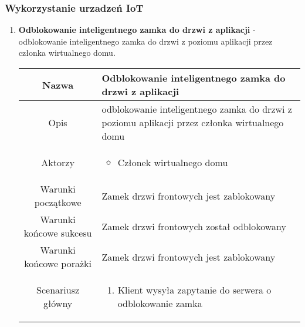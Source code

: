 \documentclass{article}
\begin{document}
\begin{enumerate}
		\subsubsection{Wykorzystanie urzadzeń IoT}
		\begin{enumerate}
			\item \textbf{Odblokowanie inteligentnego zamka do drzwi z aplikacji} -
				odblokowanie inteligentnego zamka do drzwi z poziomu aplikacji przez
				członka wirtualnego domu.
				\begin{table}[H]
					\centering
					\begin{tabular}{|c|p{7cm}|}
						\hline
						Nazwa                   & \textbf{Odblokowanie inteligentnego zamka do drzwi z aplikacji}                                                                                                                                          \\
						\hline
						Opis                    & odblokowanie inteligentnego zamka do drzwi z poziomu aplikacji przez członka wirtualnego domu                                                                                                            \\
						\hline
						Aktorzy                 & \begin{itemize}\item Członek wirtualnego domu\end{itemize}                                                                                                                                               \\
						\hline
						Warunki początkowe      & Zamek drzwi frontowych jest zablokowany                                                                                                                                                                  \\
						\hline
						Warunki końcowe sukcesu & Zamek drzwi frontowych został odblokowany                                                                                                                                                                \\
						\hline
						Warunki końcowe porażki & Zamek drzwi frontowych jest zablokowany                                                                                                                                                                  \\
						\hline
						Scenariusz główny       & \begin{enumerate}\item Klient wysyła zapytanie do serwera o odblokowanie zamka


\end{enumerate}
\end{tabular}
\end{table}
\end{enumerate}
\end{enumerate}
\end{document}
